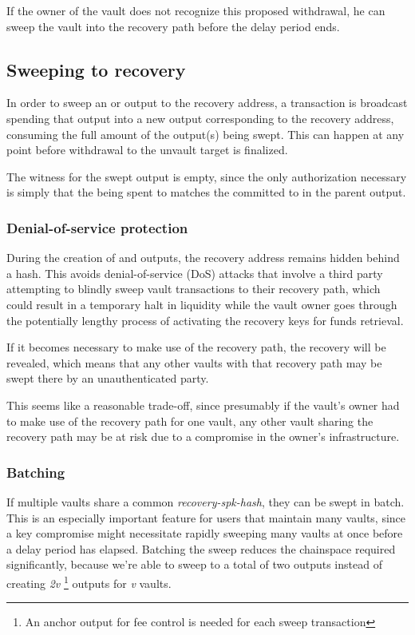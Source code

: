 \documentclass[10pt]{article}
\begin{document}
If the owner of the vault does not recognize this proposed
withdrawal, he can sweep the vault into the recovery path before the delay period ends.


\subsection*{Sweeping to recovery}

In order to sweep an \opv{} or \opuv{} output to the recovery address, a transaction is
broadcast spending that output into a new output corresponding to the recovery address,
consuming the full amount of the output(s) being swept. This can happen at any point
before withdrawal to the unvault target is finalized. 

The witness for the swept output is empty, since the only authorization necessary 
is simply that the \spk{} being spent to matches the  committed
to in the parent \opv{} output.

\subsubsection*{Denial-of-service protection}

During the creation of \opv{} and \opuv{} outputs, the recovery address remains hidden
behind a hash. This avoids denial-of-service (DoS) attacks that involve a third party
attempting to blindly sweep vault transactions to their recovery path, which could
result in a temporary halt in liquidity while the vault owner goes through the
potentially lengthy process of activating the recovery keys for funds retrieval.

If it becomes necessary to make use of the recovery path, the recovery \spk{} will be
revealed, which means that any other vaults with that recovery path may be swept there
by an unauthenticated party. 

This seems like a reasonable trade-off, since presumably if the vault's owner
had to make use of the recovery path for one vault, any other vault sharing the
recovery path may be at risk due to a compromise in the owner's infrastructure.

\subsubsection*{Batching}

If multiple vaults share a common \emph{recovery-spk-hash}, they can be swept in batch.
This is an especially important feature for users that maintain many vaults, since a key
compromise might necessitate rapidly sweeping many vaults at once before a delay
period has elapsed. Batching the sweep reduces the chainspace required significantly,
because we're able to sweep to a total of two outputs instead of
creating \emph{2v} \footnote{An anchor output for fee control
is needed for each sweep transaction} 
outputs for \emph{v} vaults.
\end{document}
